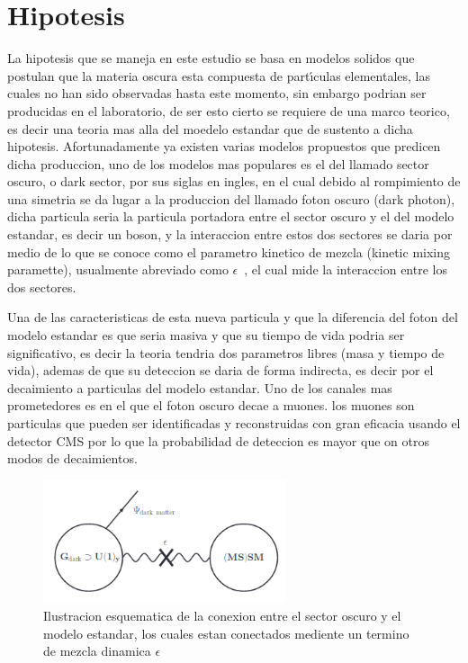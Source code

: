 \chapter{Hipotesis}

La hipotesis que se maneja en este estudio se basa en modelos solidos que postulan que la materia oscura esta compuesta de part\'{\i}culas elementales, las cuales no han sido observadas hasta este momento, sin embargo podrian ser producidas en el laboratorio, de ser esto cierto se requiere de una marco teorico, es decir una teoria mas alla del moedelo estandar que de sustento a dicha hipotesis. Afortunadamente ya existen varias modelos propuestos que predicen dicha produccion, uno de los modelos mas populares es el del llamado sector oscuro, o dark sector, por sus siglas en ingles, en el cual debido al rompimiento de una simetria se da lugar a la produccion del llamado foton oscuro (dark photon), dicha particula seria la particula portadora entre el sector oscuro y el del modelo estandar, es decir un boson, y la interaccion entre estos dos sectores se daria por medio de lo que se conoce como el parametro kinetico de mezcla (kinetic mixing paramette), usualmente abreviado como $\epsilon$~\cite{LB}, el cual mide la interaccion entre los dos sectores.

Una de las caracteristicas de esta nueva particula y que la diferencia del foton del modelo estandar es que seria masiva y que su tiempo de vida podria ser significativo, es decir la teoria tendria dos parametros libres (masa y tiempo de vida), ademas de que su deteccion se daria de forma indirecta, es decir por el decaimiento a particulas del modelo estandar.  Uno de los canales mas prometedores es en el que el foton oscuro decae a muones. los muones son particulas que pueden ser identificadas y reconstruidas con gran eficacia usando el detector CMS por lo que la probabilidad de deteccion es mayor que on otros modos de decaimientos.

\begin{figure}
\begin{center}
  \includegraphics[width=2.8in]{sketch_darksector.png}
  \caption{Ilustracion esquematica de la conexion entre el sector oscuro y el modelo estandar, los cuales estan conectados mediente un termino de mezcla dinamica $\epsilon$}
  \label{fig:AMS_positron}
\end{center}
\end{figure}


